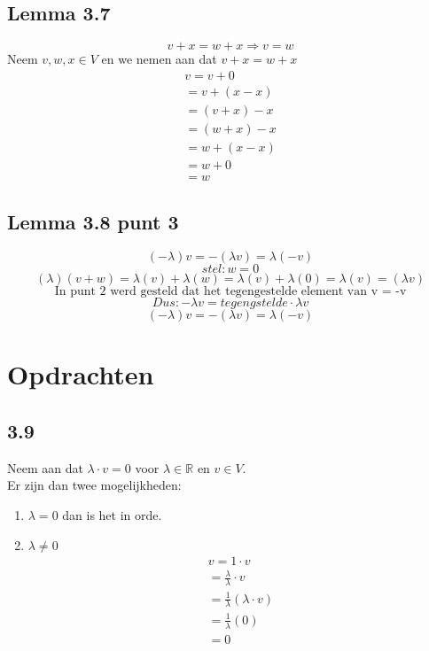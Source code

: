 \documentclass[lineaire_algebra_oplossingen.tex]{subfiles}
\begin{document}
\subsection{Lemma 3.7}

$$v+x = w + x \Rightarrow v=w$$
Neem $v,w,x \in V$ en we nemen aan dat $v+x = w+x$\\
\begin{align*}
v = v + 0 \tag{neutraal element}\\
= v + (x - x) \tag{invers element}\\
=(v+x) -x \tag{communativiteit}\\
=(w+x) -x \tag{dit hebben we aangenomen}\\
= w +(x-x) \tag{communitativiteit}\\
= w+0 \tag{invers element}\\
=w \tag{neutraal element}
\end{align*}

\subsection{Lemma 3.8 punt 3}
\[(-\lambda)v = -(\lambda v) = \lambda(-v)\]
\[stel:w=0\]
\[(\lambda)(v+w) = \lambda(v) + \lambda(w) = \lambda(v) + \lambda(0) = \lambda(v) = (\lambda v) \]
\[\text{In punt 2 werd gesteld dat het tegengestelde element van v = -v}\]
\[Dus: -\lambda v = tegengstelde \cdot \lambda v\]
\[(-\lambda)v = -(\lambda v) = \lambda(-v) \]

\section{Opdrachten}
\subsection{3.9}
Neem aan dat $\lambda \cdot v = 0$ voor $\lambda \in \mathbb{R}$ en $v \in V$.\\
Er zijn dan twee mogelijkheden:\\
\begin{enumerate}
\item $\lambda = 0$ dan is het in orde.
\item $\lambda \neq 0$
\begin{align*}
v = 1\cdot v \tag{co\"efficient}
\\
= \frac{\lambda}{\lambda}\cdot v
\\
= \frac{1}{\lambda}(\lambda \cdot v) \tag{gemegde associativiteit}
\\
= \frac{1}{\lambda}(0) \tag{lemma 3.8.1}
\\
= 0
\end{align*}

\end{enumerate}
\end{document}
